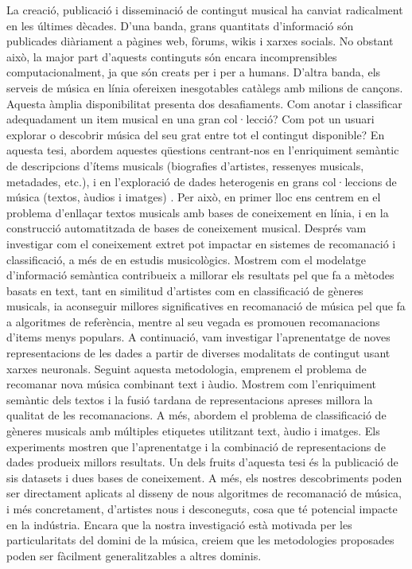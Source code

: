 La creació, publicació i disseminació de contingut musical ha canviat radicalment en les últimes dècades. D'una banda, grans quantitats d'informació són publicades diàriament a pàgines web, fòrums, wikis i xarxes socials. No obstant això, la major part d'aquests continguts són encara incomprensibles computacionalment, ja que són creats per i per a humans. D'altra banda, els serveis de música en línia ofereixen inesgotables catàlegs amb milions de cançons. Aquesta àmplia disponibilitat presenta dos desafiaments. Com anotar i classificar adequadament un item musical en una gran col·lecció? Com pot un usuari explorar o descobrir música del seu grat entre tot el contingut disponible? En aquesta tesi, abordem aquestes qüestions centrant-nos en l'enriquiment semàntic de descripcions d'ítems musicals (biografies d'artistes, ressenyes musicals, metadades, etc.), i en l'exploració de dades heterogenis en grans col·leccions de música (textos, àudios i imatges) . Per això, en primer lloc ens centrem en el problema d'enllaçar textos musicals amb bases de coneixement en línia, i en la construcció automatitzada de bases de coneixement musical. Després vam investigar com el coneixement extret pot impactar en sistemes de recomanació i classificació, a més de en estudis musicològics. Mostrem com el modelatge d'informació semàntica contribueix a millorar els resultats pel que fa a mètodes basats en text, tant en similitud d'artistes com en classificació de gèneres musicals, ia aconseguir millores significatives en recomanació de música pel que fa a algoritmes de referència, mentre al seu vegada es promouen recomanacions d'items menys populars. A continuació, vam investigar l'aprenentatge de noves representacions de les dades a partir de diverses modalitats de contingut usant xarxes neuronals. Seguint aquesta metodologia, emprenem el problema de recomanar nova música combinant text i àudio. Mostrem com l'enriquiment semàntic dels textos i la fusió tardana de representacions apreses millora la qualitat de les recomanacions. A més, abordem el problema de classificació de gèneres musicals amb múltiples etiquetes utilitzant text, àudio i imatges. Els experiments mostren que l'aprenentatge i la combinació de representacions de dades produeix millors resultats. Un dels fruits d'aquesta tesi és la publicació de sis datasets i dues bases de coneixement. A més, els nostres descobriments poden ser directament aplicats al disseny de nous algoritmes de recomanació de música, i més concretament, d'artistes nous i desconeguts, cosa que té potencial impacte en la indústria. Encara que la nostra investigació està motivada per les particularitats del domini de la música, creiem que les metodologies proposades poden ser fàcilment generalitzables a altres dominis.